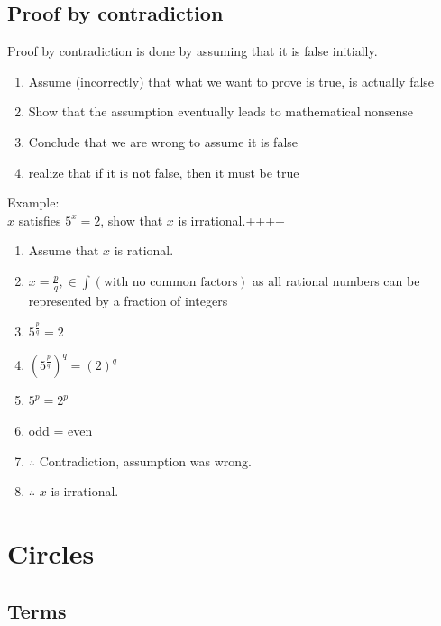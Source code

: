 \documentclass[a4paper,10pt]{report}
\begin{document}
\subsection{Proof by contradiction}
Proof by contradiction is done by assuming that it is false initially.
\begin{enumerate}
	\item Assume (incorrectly) that what we want to prove is true, is actually false
	\item Show that the assumption eventually leads to mathematical nonsense
	\item Conclude that we are wrong to assume it is false
	\item realize that if it is not false, then it must be true
\end{enumerate}
Example:\\
$x$ satisfies $5^x = 2$, show that $x$ is irrational.++++
\begin{enumerate}
	\item Assume that $x$ is rational.
	\item $x = \frac{p}{q}, \in \int (\text{with no common factors})$ as all rational numbers can be represented by a fraction of integers
	\item $5^{\frac{p}{q}} = 2$
	\item $(5^{\frac{p}{q}})^q = (2)^q$
	\item $5^p = 2^p$
	\item odd = even
	\item $\therefore$ Contradiction, assumption was wrong.
	\item $\therefore$ $x$ is irrational.
\end{enumerate}

\section{Circles}
\subsection{Terms}
\end{document}
